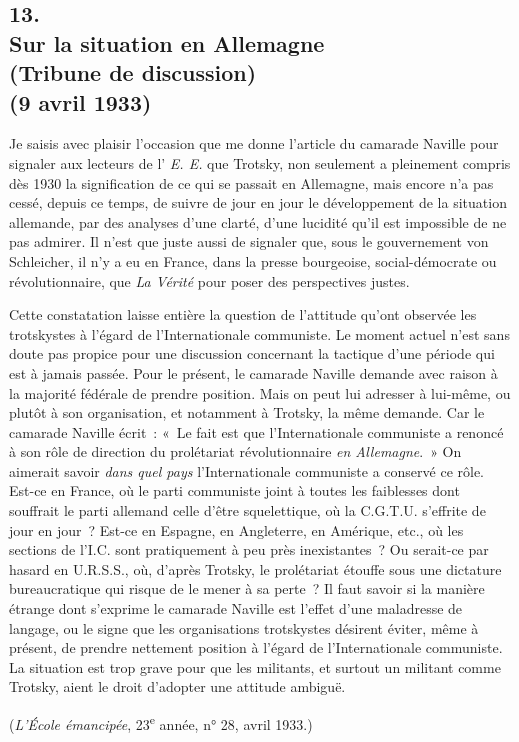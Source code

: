 \documentclass[french,twoside]{book} %
\begin{document}
\begin{center}
\end{center}
\subsection[13. Sur la situation en Allemagne, (Tribune de discussion) (9 avril 1933)]{13. \\
Sur la situation en Allemagne \\
(Tribune de discussion) \\
(9 avril 1933)}
\noindent \par
Je saisis avec plaisir l'occasion que me donne l'article du camarade Naville pour signaler aux lecteurs de l' {\itshape E. E.} que Trotsky, non seulement a pleinement compris dès 1930 la signification de ce qui se passait en Allemagne, mais encore n'a pas cessé, depuis ce temps, de suivre de jour en jour le dévelop­pement de la situation allemande, par des analyses d'une clarté, d'une lucidité qu'il est impossible de ne pas admirer. Il n'est que juste aussi de signaler que, sous le gouvernement von Schleicher, il n'y a eu en France, dans la presse bourgeoise, social-démocrate ou révolutionnaire, que {\itshape La Vérité} pour poser des perspectives justes.\par
Cette constatation laisse entière la question de l'attitude qu'ont observée les trotskystes à l'égard de l'Internationale communiste. Le moment actuel n'est sans doute pas propice pour une discussion concernant la tactique d'une période qui est à jamais passée. Pour le présent, le camarade Naville demande avec raison à la majorité fédérale de prendre position. Mais on peut lui adresser à lui-même, ou plutôt à son organisation, et notamment à Trotsky, la même demande. Car le camarade Naville écrit : « Le fait est que l'Interna­tionale communiste a renoncé à son rôle de direction du prolétariat révolu­tionnaire {\itshape en Allemagne}. » On aimerait savoir {\itshape dans quel pays} l'Internationale communiste a conservé ce rôle. Est-ce en France, où le parti communiste joint à toutes les faiblesses dont souffrait le parti allemand celle d'être squelettique, où la C.G.T.U. s'effrite de jour en jour ? Est-ce en Espagne, en Angleterre, en Amérique, etc., où les sections de l'I.C. sont pratiquement à peu près inexis­tantes ? Ou serait-ce par hasard en U.R.S.S., où, d'après Trotsky, le prolétariat étouffe sous une dictature bureaucratique qui risque de le mener à sa perte ? Il faut savoir si la manière étrange dont s'exprime le camarade Naville est l'effet d'une maladresse de langage, ou le signe que les organisations trotskystes désirent éviter, même à présent, de prendre nettement position à l'égard de l'Internationale communiste. La situation est trop grave pour que les militants, et surtout un militant comme Trotsky, aient le droit d'adopter une attitude ambiguë.\par
({\itshape L'École émancipée}, 23\textsuperscript{e} année, n° 28, avril 1933.)\par
\end{document}
